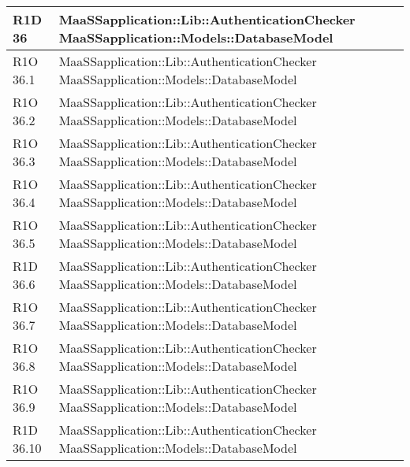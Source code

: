 \begin{center}
\begin{longtable}{ | l | p{8cm} |}
    R1D 36 & MaaSSapplication::Lib::AuthenticationChecker \newline  MaaSSapplication::Models::DatabaseModel \\ \hline
        
    R1O 36.1 & MaaSSapplication::Lib::AuthenticationChecker \newline  MaaSSapplication::Models::DatabaseModel \\ \hline
   	      	
      	R1O 36.2 & MaaSSapplication::Lib::AuthenticationChecker \newline  MaaSSapplication::Models::DatabaseModel \\ \hline
      	
      	R1O 36.3 & MaaSSapplication::Lib::AuthenticationChecker \newline  MaaSSapplication::Models::DatabaseModel \\ \hline
   	    	
   	R1O 36.4 & MaaSSapplication::Lib::AuthenticationChecker \newline  MaaSSapplication::Models::DatabaseModel \\ \hline
   	
   	R1O 36.5 & MaaSSapplication::Lib::AuthenticationChecker \newline  MaaSSapplication::Models::DatabaseModel \\ \hline
   	
   	R1D 36.6 & MaaSSapplication::Lib::AuthenticationChecker \newline  MaaSSapplication::Models::DatabaseModel \\ \hline
   	
   	R1O 36.7 & MaaSSapplication::Lib::AuthenticationChecker \newline  MaaSSapplication::Models::DatabaseModel \\ \hline
   	
   	R1O 36.8 & MaaSSapplication::Lib::AuthenticationChecker \newline  MaaSSapplication::Models::DatabaseModel \\ \hline
   	
   	R1O 36.9 & MaaSSapplication::Lib::AuthenticationChecker \newline  MaaSSapplication::Models::DatabaseModel \\ \hline
   	
   	R1D 36.10 & MaaSSapplication::Lib::AuthenticationChecker \newline  MaaSSapplication::Models::DatabaseModel \\ \hline
   	

\end{longtable}
\end{center}
